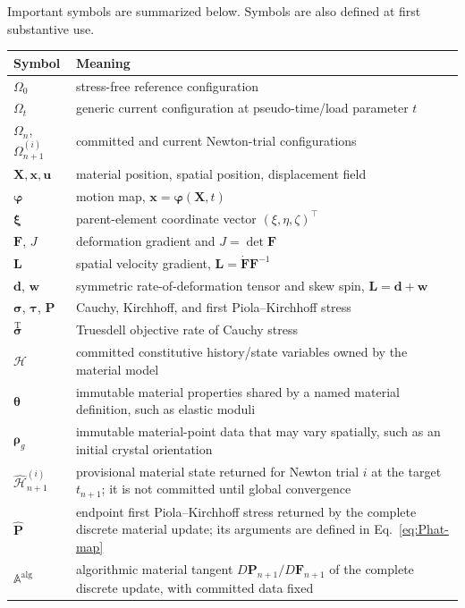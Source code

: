 \documentclass[11pt,a4paper]{article}
\newcommand{\bs}[1]{\boldsymbol{#1}}
\begin{document}
Important symbols are summarized below. Symbols are also defined at first substantive use.
\begin{longtable}{>{\raggedright\arraybackslash}p{3.0cm}>{\raggedright\arraybackslash}p{10.8cm}}
\toprule
Symbol & Meaning \\
\midrule
$\Omega_0$ & stress-free reference configuration \\
$\Omega_t$ & generic current configuration at pseudo-time/load parameter $t$ \\
$\Omega_n$, $\Omega_{n+1}^{(i)}$ & committed and current Newton-trial configurations \\
$\bs X,\bs x,\bs u$ & material position, spatial position, displacement field \\
$\bs\varphi$ & motion map, $\bs x=\bs\varphi(\bs X,t)$ \\
$\bs\xi$ & parent-element coordinate vector $(\xi,\eta,\zeta)^\top$ \\
$\bs F$, $J$ & deformation gradient and $J=\det\bs F$ \\
$\bs L$ & spatial velocity gradient, $\bs L=\dot{\bs F}\bs F^{-1}$ \\
$\bs d$, $\bs w$ & symmetric rate-of-deformation tensor and skew spin, $\bs L=\bs d+\bs w$ \\
$\bs\sigma$, $\bs\tau$, $\bs P$ & Cauchy, Kirchhoff, and first Piola--Kirchhoff stress \\
$\overset{\mathrm T}{\bs\sigma}$ & Truesdell objective rate of Cauchy stress \\
$\mathcal H$ & committed constitutive history/state variables owned by the material model \\
$\boldsymbol\theta$ & immutable material properties shared by a named material definition, such as elastic moduli \\
$\boldsymbol\rho_g$ & immutable material-point data that may vary spatially, such as an initial crystal orientation \\
$\widehat{\mathcal H}_{n+1}^{(i)}$ & provisional material state returned for Newton trial $i$ at the target $t_{n+1}$; it is not committed until global convergence \\
$\widehat{\bs P}$ & endpoint first Piola--Kirchhoff stress returned by the complete discrete material update; its arguments are defined in Eq.~\eqref{eq:Phat-map} \\
$\mathbb A^{\mathrm{alg}}$ & algorithmic material tangent $D\bs P_{n+1}/D\bs F_{n+1}$ of the complete discrete update, with committed data fixed \\

\end{longtable}
\end{document}
